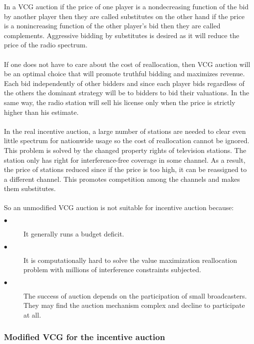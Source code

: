 \documentclass[a4paper]{article}
\begin{document}
In a VCG auction if the price of one player is a nondecreasing function of the bid by another player then they are called substitutes on the other hand if the price is a nonincreasing function of the other player's bid then they are called complements. Aggressive bidding by substitutes is desired as it will reduce the price of the radio spectrum.
\\\\
If one does not have to care about the cost of reallocation, then VCG auction will be an optimal choice that will promote truthful bidding and maximizes revenue. Each bid independently of other bidders and since each player bids regardless of the others the dominant strategy will be to bidders to bid their valuations. In the same way, the radio station will sell his license only when the price is strictly higher than his estimate.
\\\\
In the real incentive auction, a large number of stations are needed to clear even little spectrum for nationwide usage so the cost of reallocation cannot be ignored. This problem is solved by the changed property rights of television stations. The station only has right for interference-free coverage in some channel. As a result, the price of stations reduced since if the price is too high, it can be reassigned to a different channel. This promotes competition among the channels and makes them substitutes.
\\\\
So an unmodified VCG auction is not suitable for incentive auction because:

\begin{description}

\item[$\bullet$] It generally runs a budget deficit.
\item[$\bullet$] It is computationally hard to solve the value maximization reallocation problem with millions of interference constraints subjected.
\item[$\bullet$] The success of auction depends on the participation of small broadcasters. They may find the auction mechanism complex and decline to participate at all.

\end{description}

\subsubsection*{Modified VCG for the incentive auction}
\end{document}

